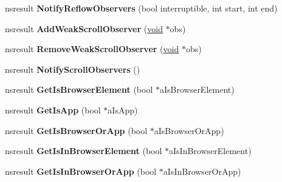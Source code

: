 \begin{DoxyCompactItemize}
\mbox{\label{interfacens_i_doc_shell_a0b90b2a04d153381e8ba5998982503e0}} 
nsresult {\bfseries Notify\+Reflow\+Observers} (bool interruptible, int start, int end)
\item 
\mbox{\label{interfacens_i_doc_shell_a9ba00907af41756cd0e96c2a8e77e1c0}} 
nsresult {\bfseries Add\+Weak\+Scroll\+Observer} (\hyperlink{interfacevoid}{void} $\ast$obs)
\item 
\mbox{\label{interfacens_i_doc_shell_a1d68e4feb0878c4dcfcf6aafdf64965d}} 
nsresult {\bfseries Remove\+Weak\+Scroll\+Observer} (\hyperlink{interfacevoid}{void} $\ast$obs)
\item 
\mbox{\label{interfacens_i_doc_shell_aa28d05418fac837ed724de0ce45cbfdb}} 
nsresult {\bfseries Notify\+Scroll\+Observers} ()
\item 
\mbox{\label{interfacens_i_doc_shell_a94e69b01561bf4ee3206deedaaecdc71}} 
nsresult {\bfseries Get\+Is\+Browser\+Element} (bool $\ast$a\+Is\+Browser\+Element)
\item 
\mbox{\label{interfacens_i_doc_shell_a27ca015da44d48cccb8c2584bff42804}} 
nsresult {\bfseries Get\+Is\+App} (bool $\ast$a\+Is\+App)
\item 
\mbox{\label{interfacens_i_doc_shell_ad35a1dbc3e925f876098b0ace02935ab}} 
nsresult {\bfseries Get\+Is\+Browser\+Or\+App} (bool $\ast$a\+Is\+Browser\+Or\+App)
\item 
\mbox{\label{interfacens_i_doc_shell_a56862003bb96c8b9402b4e2bf7cecc36}} 
nsresult {\bfseries Get\+Is\+In\+Browser\+Element} (bool $\ast$a\+Is\+In\+Browser\+Element)
\item 
\mbox{\label{interfacens_i_doc_shell_af21b1b1065b9d6c938480b61c15b7fd7}} 
nsresult {\bfseries Get\+Is\+In\+Browser\+Or\+App} (bool $\ast$a\+Is\+In\+Browser\+Or\+App)
\item 
\mbox{\label{interfacens_i_doc_shell_af2e78ead88135fbc89df3c6394a37799}} 

\end{DoxyCompactItemize}
